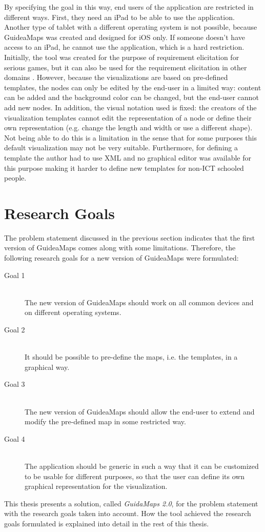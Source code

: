 By specifying the goal in this way, end users of the application are restricted in different ways. First, they need an iPad to be able to use the application. Another type of tablet with a different operating system is not possible, because GuideaMaps was created and designed for iOS only. If someone doesn't have access to an iPad, he cannot use the application, which is a hard restriction. \\

Initially, the tool was created for the purpose of requirement elicitation for serious games, but it can also be used for the requirement elicitation in other domains \citep{detroyerjanssens}. However, because the visualizations are based on pre-defined templates, the nodes can only be edited by the end-user in a limited way: content can be added and the background color can be changed, but the end-user cannot add new nodes. In addition, the visual notation used is fixed: the creators of the visualization templates cannot edit the representation of a node or define their own representation (e.g. change the length and width or use a different shape). Not being able to do this is a limitation in the sense that for some purposes this default visualization may not be very suitable. Furthermore, for defining a template the author had to use XML and no graphical editor was available for this purpose making it harder to define new templates for non-ICT schooled people.

\section{Research Goals}\label{sec:research-goals}
The problem statement discussed in the previous section indicates that the first version of GuideaMaps comes along with some limitations. Therefore, the following research goals for a new version of GuideaMaps were formulated:

\begin{description}
	\item[Goal 1] \hfill \\
	The new version of GuideaMaps should work on all common devices and on different operating systems.
	
	\item[Goal 2] \hfill \\
	It should be possible to pre-define the maps, i.e. the templates, in a graphical way.
	
	\item[Goal 3] \hfill \\
	The new version of GuideaMaps should allow the end-user to extend and modify the pre-defined map in some restricted way.
	
	\item[Goal 4] \hfill \\
	The application should be generic in such a way that it can be customized to be usable for different purposes, so that the user can define its own graphical representation for the visualization.
\end{description}

This thesis presents a solution, called \textit{GuidaMaps 2.0}, for the problem statement with the research goals taken into account. How the tool achieved the research goals formulated is explained into detail in the rest of this thesis.